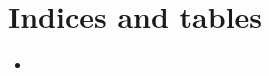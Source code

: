 \documentclass[letterpaper,12pt,english]{sphinxmanual}
\begin{document}
\chapter{Indices and tables}
\label{\detokenize{index:indices-and-tables}}\begin{itemize}
\item {} 

\end{itemize}



\renewcommand{\indexname}{索引}
\printindex
\end{document}
